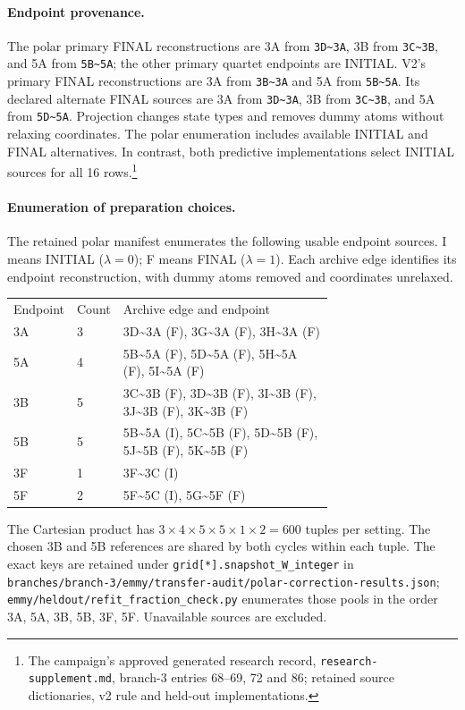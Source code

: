 \documentclass{article}
\newcommand{\rr}[1]{\footnote{The campaign's approved generated research record, \texttt{research-supplement.md}, #1.}}
\begin{document}
\paragraph{Endpoint provenance.}
The polar primary FINAL reconstructions are 3A from \texttt{3D\textasciitilde3A}, 3B from \texttt{3C\textasciitilde3B}, and 5A from \texttt{5B\textasciitilde5A}; the other primary quartet endpoints are INITIAL. V2's primary FINAL reconstructions are 3A from \texttt{3B\textasciitilde3A} and 5A from \texttt{5B\textasciitilde5A}. Its declared alternate FINAL sources are 3A from \texttt{3D\textasciitilde3A}, 3B from \texttt{3C\textasciitilde3B}, and 5A from \texttt{5D\textasciitilde5A}. Projection changes state types and removes dummy atoms without relaxing coordinates. The polar enumeration includes available INITIAL and FINAL alternatives. In contrast, both predictive implementations select INITIAL sources for all 16 rows.\rr{branch-3 entries 68--69, 72 and 86; retained source dictionaries, v2 rule and held-out implementations}

\paragraph{Enumeration of preparation choices.}
The retained polar manifest enumerates the following usable endpoint sources. I means INITIAL (\(\lambda=0\)); F means FINAL (\(\lambda=1\)). Each archive edge identifies its endpoint reconstruction, with dummy atoms removed and coordinates unrelaxed.
\begin{center}\begin{tabular}{llp{0.71\linewidth}}
Endpoint & Count & Archive edge and endpoint \\
3A & 3 & 3D\textasciitilde{}3A (F), 3G\textasciitilde{}3A (F), 3H\textasciitilde{}3A (F) \\
5A & 4 & 5B\textasciitilde{}5A (F), 5D\textasciitilde{}5A (F), 5H\textasciitilde{}5A (F), 5I\textasciitilde{}5A (F) \\
3B & 5 & 3C\textasciitilde{}3B (F), 3D\textasciitilde{}3B (F), 3I\textasciitilde{}3B (F), 3J\textasciitilde{}3B (F), 3K\textasciitilde{}3B (F) \\
5B & 5 & 5B\textasciitilde{}5A (I), 5C\textasciitilde{}5B (F), 5D\textasciitilde{}5B (F), 5J\textasciitilde{}5B (F), 5K\textasciitilde{}5B (F) \\
3F & 1 & 3F\textasciitilde{}3C (I) \\
5F & 2 & 5F\textasciitilde{}5C (I), 5G\textasciitilde{}5F (F) \\
\end{tabular}\end{center}
The Cartesian product has \(3\times4\times5\times5\times1\times2=600\) tuples per setting. The chosen 3B and 5B references are shared by both cycles within each tuple. The exact keys are retained under \texttt{grid[*].snapshot\_W\_integer} in \texttt{branches/branch-3/emmy/transfer-audit/polar-correction-results.json}; \texttt{emmy/heldout/refit\_fraction\_check.py} enumerates those pools in the order 3A, 5A, 3B, 5B, 3F, 5F. Unavailable sources are excluded.
\end{document}
